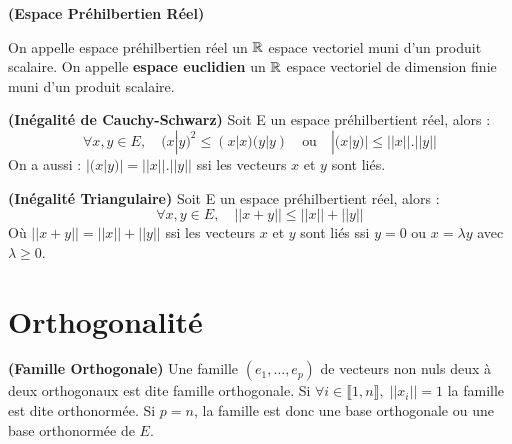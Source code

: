 \begin{definition}
    \textbf{(Espace Préhilbertien Réel)}

    On appelle espace préhilbertien réel un $\mathbb{R}$ espace vectoriel muni d'un produit scalaire. 
    On appelle \textbf{espace euclidien} un $\mathbb{R}$ espace vectoriel de dimension finie muni d'un produit scalaire.
\end{definition}

\begin{theorem}
    \textbf{(Inégalité de Cauchy-Schwarz)}
    Soit E un espace préhilbertient réel, alors : \[ \forall x, y \in E, \quad  \boxed { (x|y)^2 \leq (x|x)(y|y) \quad \text{ou} \quad |(x|y)| \leq ||x||.||y|| }  \]
    On a aussi : $ |(x|y)| = ||x||.||y|| $ ssi les vecteurs $x$ et $y$ sont liés.
\end{theorem}

\begin{proposition}
    \textbf{(Inégalité Triangulaire)}
    Soit E un espace préhilbertient réel, alors : \[ \forall x, y \in E, \quad \boxed{ ||x + y|| \leq ||x|| + ||y|| } \] 
    Où $ ||x + y|| = ||x|| + ||y|| $ ssi les vecteurs $x$ et $y$ sont liés ssi $y = 0$ ou $x = \lambda y$ avec $\lambda \geq 0 $.
\end{proposition}





\section*{Orthogonalité}

\begin{definition}
    \textbf{(Famille Orthogonale)}
    Une famille $(e_1, \dots, e_p)$ de vecteurs non nuls deux à deux orthogonaux est dite famille orthogonale. Si $ \forall i \in \llbracket 1, n \rrbracket , \; ||x_i|| = 1 $ la famille est dite orthonormée.
    Si $ p = n$, la famille est donc une base orthogonale ou une base orthonormée de $E$.
\end{definition}

